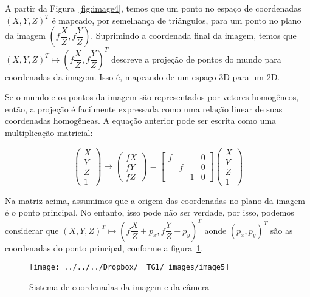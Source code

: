 \documentclass[ecp,tc]{iiufrgs}
\begin{document}
A partir da Figura~\ref{fig:image4}, temos que um ponto no espaço de coordenadas $(X, Y, Z)^T$ é mapeado, por semelhança de triângulos, para um ponto no plano da imagem $ (f\dfrac{X}{Z}, f\dfrac{Y}{Z}) $.
Suprimindo a coordenada final da imagem, temos que $ (X, Y, Z)^T \mapsto (f\dfrac{X}{Z}, f\dfrac{Y}{Z})^T $ descreve  a  projeção  de  pontos  do  mundo  para  coordenadas  da  imagem.  Isso  é, mapeando de um espaço 3D para um 2D.

Se o mundo e os pontos da imagem são representados por vetores homogêneos, então, a projeção é facilmente expressada como uma relação linear de suas coordenadas homogêneas. A equação anterior pode ser escrita como uma multiplicação matricial:

\[\begin{pmatrix} X \\ Y \\ Z \\ 1 \end{pmatrix} \mapsto \begin{pmatrix} fX \\ fY \\ fZ \end{pmatrix} = \begin{bmatrix} f &  &  & 0 \\ & f & & 0 \\ & & 1 & 0 \end{bmatrix} \begin{pmatrix} X \\ Y \\ Z \\ 1 \end{pmatrix} \]

Na matriz acima, assumimos que a origem das coordenadas no plano da imagem é o ponto principal. No entanto, isso pode não ser verdade, por isso, podemos considerar que $ (X, Y, Z)^T \mapsto (f\dfrac{X}{Z} + p_x, f\dfrac{Y}{Z} + p_y)^T $ aonde $ (p_x, p_y)^T $ são as coordenadas do ponto principal, conforme a figura~\ref{fig:image5}.

\begin{figure}
	\centering
	\caption{Sistema de coordenadas da imagem e da câmera}
	\texttt{[image: ../../../Dropbox/\_\_TG1/\_images/image5]}
	\label{fig:image5}
\end{figure}
\end{document}
